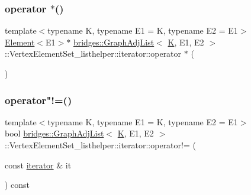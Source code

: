 \subsubsection{\texorpdfstring{operator $\ast$()}{operator *()}}
{\footnotesize\ttfamily template$<$typename K, typename E1 = K, typename E2 = E1$>$ \\
\mbox{\hyperlink{classbridges_1_1_element}{Element}}$<$E1$>$$\ast$ \mbox{\hyperlink{classbridges_1_1_graph_adj_list}{bridges\+::\+Graph\+Adj\+List}}$<$ \mbox{\hyperlink{namespacebridges_acfb0a4f7877d8f63de3e6862004c50edaa5f3c6a11b03839d46af9fb43c97c188}{K}}, E1, E2 $>$\+::Vertex\+Element\+Set\+\_\+listhelper\+::iterator\+::operator $\ast$ (\begin{DoxyParamCaption}{ }\end{DoxyParamCaption})\hspace{0.3cm}{\ttfamily [inline]}}

\mbox{\label{classbridges_1_1_graph_adj_list_1_1_vertex_element_set__listhelper_1_1iterator_a559f32f0f60269d7d8b793e197e9b0ba}} 
\subsubsection{\texorpdfstring{operator"!=()}{operator!=()}}
{\footnotesize\ttfamily template$<$typename K, typename E1 = K, typename E2 = E1$>$ \\
bool \mbox{\hyperlink{classbridges_1_1_graph_adj_list}{bridges\+::\+Graph\+Adj\+List}}$<$ \mbox{\hyperlink{namespacebridges_acfb0a4f7877d8f63de3e6862004c50edaa5f3c6a11b03839d46af9fb43c97c188}{K}}, E1, E2 $>$\+::Vertex\+Element\+Set\+\_\+listhelper\+::iterator\+::operator!= (\begin{DoxyParamCaption}\item[{const \mbox{\hyperlink{classbridges_1_1_graph_adj_list_1_1_vertex_element_set__listhelper_1_1iterator}{iterator}} \&}]{it }\end{DoxyParamCaption}) const\hspace{0.3cm}{\ttfamily [inline]}}

